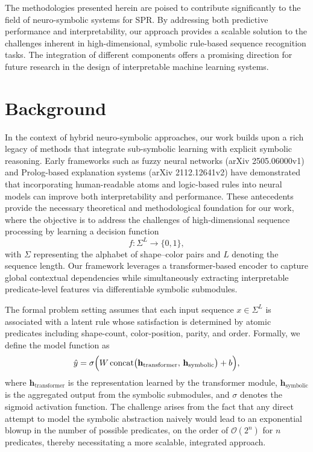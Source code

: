 \documentclass{article}
\begin{document}
The methodologies presented herein are poised to contribute significantly to the field of neuro-symbolic systems for SPR. By addressing both predictive performance and interpretability, our approach provides a scalable solution to the challenges inherent in high-dimensional, symbolic rule-based sequence recognition tasks. The integration of different components offers a promising direction for future research in the design of interpretable machine learning systems.

\section{Background}
In the context of hybrid neuro-symbolic approaches, our work builds upon a rich legacy of methods that integrate sub-symbolic learning with explicit symbolic reasoning. Early frameworks such as fuzzy neural networks (arXiv 2505.06000v1) and Prolog-based explanation systems (arXiv 2112.12641v2) have demonstrated that incorporating human-readable atoms and logic-based rules into neural models can improve both interpretability and performance. These antecedents provide the necessary theoretical and methodological foundation for our work, where the objective is to address the challenges of high-dimensional sequence processing by learning a decision function 
\[
f: \Sigma^L \to \{0,1\},
\]
with \(\Sigma\) representing the alphabet of shape–color pairs and \(L\) denoting the sequence length. Our framework leverages a transformer-based encoder to capture global contextual dependencies while simultaneously extracting interpretable predicate-level features via differentiable symbolic submodules.

The formal problem setting assumes that each input sequence \(x \in \Sigma^L\) is associated with a latent rule whose satisfaction is determined by atomic predicates including shape-count, color-position, parity, and order. Formally, we define the model function as
\[
\hat{y} = \sigma\Bigl(W\,\text{concat}\bigl(\mathbf{h}_{\text{transformer}},\, \mathbf{h}_{\text{symbolic}}\bigr) + b\Bigr),
\]
where \(\mathbf{h}_{\text{transformer}}\) is the representation learned by the transformer module, \(\mathbf{h}_{\text{symbolic}}\) is the aggregated output from the symbolic submodules, and \(\sigma\) denotes the sigmoid activation function. The challenge arises from the fact that any direct attempt to model the symbolic abstraction naively would lead to an exponential blowup in the number of possible predicates, on the order of \(\mathcal{O}(2^n)\) for \(n\) predicates, thereby necessitating a more scalable, integrated approach.
\end{document}
